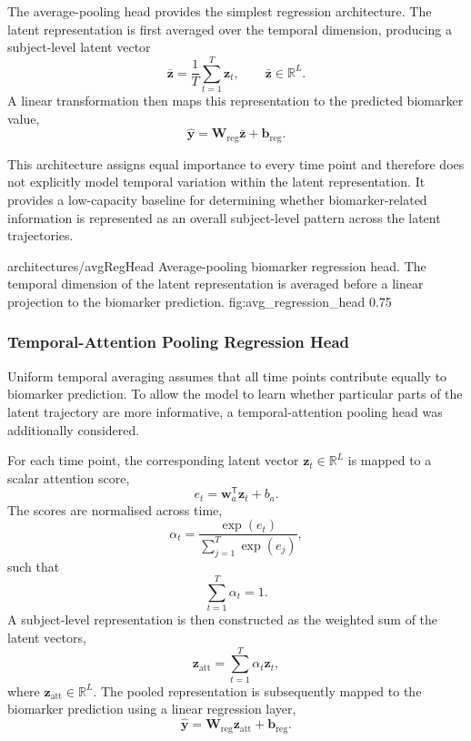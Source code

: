 The average-pooling head provides the simplest regression architecture. The
latent representation is first averaged over the temporal dimension,
producing a subject-level latent vector
\[
    \bar{\mathbf{z}}
    =
    \frac{1}{T}
    \sum_{t=1}^{T}
    \mathbf{z}_{t},
    \qquad
    \bar{\mathbf{z}}\in\mathbb{R}^{L}.
\]
A linear transformation then maps this representation to the predicted
biomarker value,
\begin{equation}
    \hat{\mathbf{y}}
    =
    \mathbf{W}_{\mathrm{reg}}
    \bar{\mathbf{z}}
    +
    \mathbf{b}_{\mathrm{reg}}.
\end{equation}

This architecture assigns equal importance to every time point and therefore
does not explicitly model temporal variation within the latent
representation. It provides a low-capacity baseline for determining whether
biomarker-related information is represented as an overall subject-level
pattern across the latent trajectories.

\thesisfigure
    {architectures/avgRegHead}
    {Average-pooling biomarker regression head. The temporal dimension of
    the latent representation is averaged before a linear projection to the
    biomarker prediction.}
    {fig:avg_regression_head}
    {0.75\textwidth}


\subsubsection{Temporal-Attention Pooling Regression Head}

Uniform temporal averaging assumes that all time points contribute equally
to biomarker prediction. To allow the model to learn whether particular
parts of the latent trajectory are more informative, a temporal-attention
pooling head was additionally considered.

For each time point, the corresponding latent vector
$\mathbf{z}_{t}\in\mathbb{R}^{L}$ is mapped to a scalar attention score,
\begin{equation}
    e_t
    =
    \mathbf{w}_{a}^{\mathsf{T}}
    \mathbf{z}_{t}
    +
    b_a.
\end{equation}
The scores are normalised across time,
\begin{equation}
    \alpha_t
    =
    \frac{\exp(e_t)}
    {\sum_{j=1}^{T}\exp(e_j)},
\end{equation}
such that
\[
    \sum_{t=1}^{T}\alpha_t=1.
\]
A subject-level representation is then constructed as the weighted sum of
the latent vectors,
\begin{equation}
    \mathbf{z}_{\mathrm{att}}
    =
    \sum_{t=1}^{T}
    \alpha_t\mathbf{z}_{t},
\end{equation}
where
$\mathbf{z}_{\mathrm{att}}\in\mathbb{R}^{L}$.
The pooled representation is subsequently mapped to the biomarker
prediction using a linear regression layer,
\begin{equation}
    \hat{\mathbf{y}}
    =
    \mathbf{W}_{\mathrm{reg}}
    \mathbf{z}_{\mathrm{att}}
    +
    \mathbf{b}_{\mathrm{reg}}.
\end{equation}

